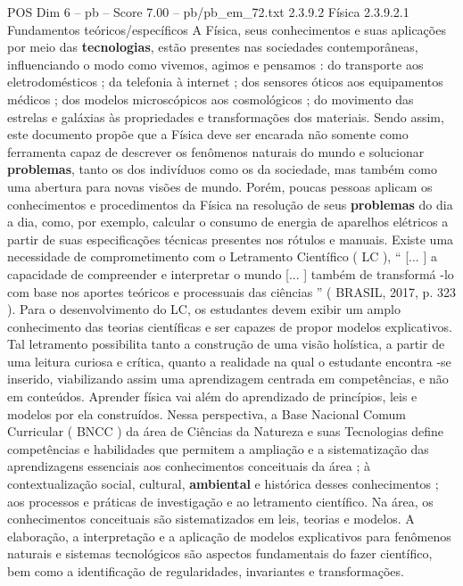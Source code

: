 \begin{textsample}{POS Dim 6 – pb – Score 7.00 – pb/pb\_em\_72.txt}  \label{ex:f6_pos_208}
2.3.9.2 Física 2.3.9.2.1 Fundamentos teóricos/específicos A Física, seus conhecimentos e suas aplicações por meio das \textbf{tecnologias}, estão presentes nas sociedades contemporâneas, influenciando o modo como vivemos, agimos e pensamos : do transporte aos eletrodomésticos ; da telefonia à internet ; dos sensores óticos aos equipamentos médicos ; dos modelos microscópicos aos cosmológicos ; do movimento das estrelas e galáxias às propriedades e transformações dos materiais.
Sendo assim, este documento propõe que a Física deve ser encarada não somente como ferramenta capaz de descrever os fenômenos naturais do mundo e solucionar \textbf{problemas}, tanto os dos indivíduos como os da sociedade, mas também como uma abertura para novas visões de mundo.
Porém, poucas pessoas aplicam os conhecimentos e procedimentos da Física na resolução de seus \textbf{problemas} do dia a dia, como, por exemplo, calcular o consumo de energia de aparelhos elétricos a partir de suas especificações técnicas presentes nos rótulos e manuais.
Existe uma necessidade de comprometimento com o Letramento Científico ( LC ), “ [... ] a capacidade de compreender e interpretar o mundo [... ] também de transformá -lo com base nos aportes teóricos e processuais das ciências ” ( BRASIL, 2017, p. 323 ).
Para o desenvolvimento do LC, os estudantes devem exibir um amplo conhecimento das teorias científicas e ser capazes de propor modelos explicativos.
Tal letramento possibilita tanto a construção de uma visão holística, a partir de uma leitura curiosa e crítica, quanto a realidade na qual o estudante encontra -se inserido, viabilizando assim uma aprendizagem centrada em competências, e não em conteúdos.
Aprender física vai além do aprendizado de princípios, leis e modelos por ela construídos.
Nessa perspectiva, a Base Nacional Comum Curricular ( BNCC ) da área de Ciências da Natureza e suas Tecnologias define competências e habilidades que permitem a ampliação e a sistematização das aprendizagens essenciais aos conhecimentos conceituais da área ; à contextualização social, cultural, \textbf{ambiental} e histórica desses conhecimentos ; aos processos e práticas de investigação e ao letramento científico.
Na área, os conhecimentos conceituais são sistematizados em leis, teorias e modelos.
A elaboração, a interpretação e a aplicação de modelos explicativos para fenômenos naturais e sistemas tecnológicos são aspectos fundamentais do fazer científico, bem como a identificação de regularidades, invariantes e transformações.

\end{textsample}
